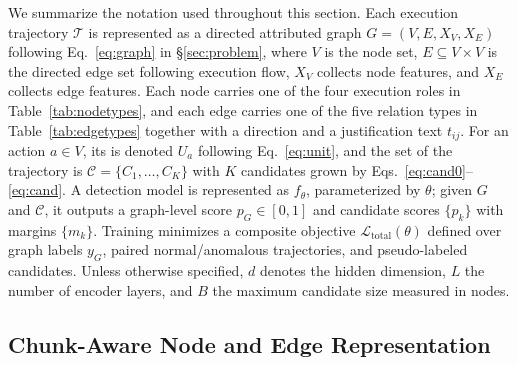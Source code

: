 We summarize the notation used throughout this section. Each execution trajectory $\mathcal{T}$ is represented as a directed attributed graph $G=(V,E,X_V,X_E)$ following Eq.~\eqref{eq:graph} in \S\ref{sec:problem}, where $V$ is the node set, $E\subseteq V\times V$ is the directed edge set following execution flow, $X_V$ collects node features, and $X_E$ collects edge features. Each node carries one of the four execution roles in Table~\ref{tab:nodetypes}, and each edge carries one of the five relation types in Table~\ref{tab:edgetypes} together with a direction and a justification text $t_{ij}$. For an action $a\in V$, its \aeu{} is denoted $U_a$ following Eq.~\eqref{eq:unit}, and the \csg{} set of the trajectory is $\mathcal{C}=\{C_1,\dots,C_K\}$ with $K$ candidates grown by Eqs.~\eqref{eq:cand0}--\eqref{eq:cand}. A detection model is represented as $f_\theta$, parameterized by $\theta$; given $G$ and $\mathcal{C}$, it outputs a graph-level score $p_G\in[0,1]$ and candidate scores $\{p_k\}$ with margins $\{m_k\}$. Training minimizes a composite objective $\mathcal{L}_{\mathrm{total}}(\theta)$ defined over graph labels $y_G$, paired normal/anomalous trajectories, and pseudo-labeled candidates. Unless otherwise specified, $d$ denotes the hidden dimension, $L$ the number of encoder layers, and $B$ the maximum candidate size measured in nodes.

\subsection{Chunk-Aware Node and Edge Representation}

